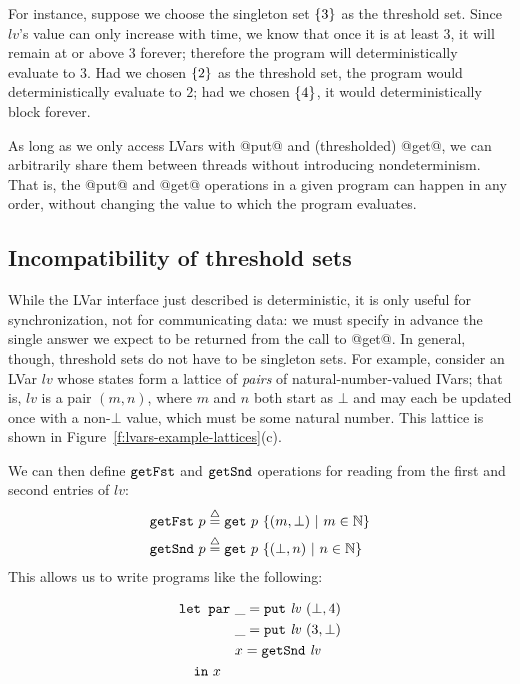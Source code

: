 For instance, suppose we choose the singleton set $\left\{3\right\}$ as the
threshold set.  Since $\mathit{lv}$'s value can only increase with
time, we know that once it is at least $3$, it will remain at or above
$3$ forever; therefore the program will deterministically evaluate to
$3$.  Had we chosen $\left\{2\right\}$ as the threshold set, the program
would deterministically evaluate to $2$; had we chosen $\left\{4\right\}$, it
would deterministically block forever.

As long as we only access LVars with @put@ and (thresholded) @get@, we
can arbitrarily share them between threads without introducing
nondeterminism. That is, the @put@ and @get@ operations in a given
program can happen in any order, without changing the value to which
the program evaluates.

\subsection{Incompatibility of threshold sets}

While the LVar interface just described is deterministic, it is only useful for
synchronization, not for communicating data: we must specify in advance the
single answer we expect to be returned from the call to @get@.  In general,
though, threshold sets do not have to be singleton sets.  For example, consider
an LVar $\mathit{lv}$ whose states form a lattice of \emph{pairs} of
natural-number-valued IVars; that is, $\mathit{lv}$ is a pair $(m, n)$, where
$m$ and $n$ both start as $\bot$ and may each be updated once with a non-$\bot$
value, which must be some natural number.
This lattice is shown in Figure~\ref{f:lvars-example-lattices}(c).

We can then define $\mbox{\texttt{getFst}}$ and
$\mbox{\texttt{getSnd}}$ operations for reading from the first and second entries of
$\mathit{lv}$:
\begin{align*}
\mbox{\texttt{getFst}}~p & \stackrel{\triangle}{=} \mbox{\texttt{get}}~p~\lbrace (m, \bot) \ | \  m \in
    \mathbb{N} \rbrace \\
\mbox{\texttt{getSnd}}~p & \stackrel{\triangle}{=} \mbox{\texttt{get}}~p~\lbrace (\bot, n) \ | \  n \in
    \mathbb{N} \rbrace
\end{align*}
This allows us to write programs like the following:

\singlespacing
\begin{equation}
\begin{split}
& \LETPAR ~\_ = \putexp{\mathit{lv}}{(\bot, 4)} \\
&  \letparspace ~\_ = \putexp{\mathit{lv}}{(3, \bot)} \\
&  \letparspace ~x = \getsndexp{\mathit{lv}} \\
&  \letspace \IN~x
\end{split}
\label{e:lvar-example-4}
\end{equation}
\doublespacing

